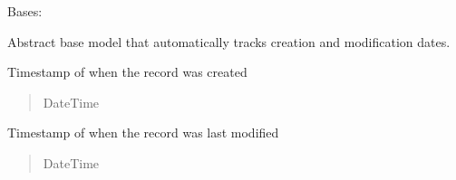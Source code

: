 \documentclass[a4paper,12pt,ngerman]{sphinxmanual}
\begin{document}

\begin{fulllineitems}
\label{\detokenize{sections/models:pages_app.models.base.TimestampedModel}}
\pysigstartsignatures
\pysiglinewithargsret
{}
{\sphinxparamcomma {}}
{}
\pysigstopsignatures
\sphinxAtStartPar
Bases: 

\sphinxAtStartPar
Abstract base model that automatically tracks creation and modification dates.

\begin{fulllineitems}
\label{\detokenize{sections/models:pages_app.models.base.TimestampedModel.created_at}}
\pysigstartsignatures
\pysigline
{}
\pysigstopsignatures
\sphinxAtStartPar
Timestamp of when the record was created
\begin{quote}\begin{description}
\sphinxAtStartPar
DateTime

\end{description}\end{quote}

\end{fulllineitems}


\begin{fulllineitems}
\label{\detokenize{sections/models:pages_app.models.base.TimestampedModel.updated_at}}
\pysigstartsignatures
\pysigline
{}
\pysigstopsignatures
\sphinxAtStartPar
Timestamp of when the record was last modified
\begin{quote}\begin{description}
\sphinxAtStartPar
DateTime

\end{description}\end{quote}


\end{fulllineitems}
\end{fulllineitems}
\end{document}
